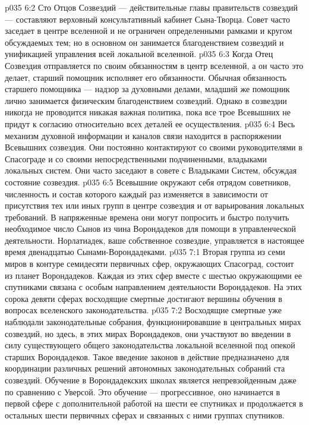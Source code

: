 \vs p035 6:2 Сто Отцов Созвездий --- действительные главы правительств созвездий --- составляют верховный консультативный кабинет Сына\hyp{}Творца. Совет часто заседает в центре вселенной и не ограничен определенными рамками и кругом обсуждаемых тем; но в основном он занимается благоденствием созвездий и унификацией управления всей локальной вселенной.
\vs p035 6:3 Когда Отец Созвездия отправляется по своим обязанностям в центр вселенной, а он часто это делает, старший помощник исполняет его обязанности. Обычная обязанность старшего помощника --- надзор за духовными делами, младший же помощник лично занимается физическим благоденствием созвездий. Однако в созвездии никогда не проводится никакая важная политика, пока все трое Всевышних не придут к согласию относительно всех деталей ее осуществления.
\vs p035 6:4 Весь механизм духовной информации и каналов связи находится в распоряжении Всевышних созвездия. Они постоянно контактируют со своими руководителями в Спасограде и со своими непосредственными подчиненными, владыками локальных систем. Они часто заседают в совете с Владыками Систем, обсуждая состояние созвездия.
\vs p035 6:5 Всевышние окружают себя отрядом советников, численность и состав которого каждый раз изменяется в зависимости от присутствия тех или иных групп в центре созвездия и от варьирования локальных требований. В напряженные времена они могут попросить и быстро получить необходимое число Сынов из чина Ворондадеков для помощи в управленческой деятельности. Норлатиадек, ваше собственное созвездие, управляется в настоящее время двенадцатью Сынами\hyp{}Ворондадеками.
\vs p035 7:1 Вторая группа из семи миров в контуре семидесяти первичных сфер, окружающих Спасоград, состоит из планет Ворондадеков. Каждая из этих сфер вместе с шестью окружающими ее спутниками связана с особым направлением деятельности Ворондадеков. На этих сорока девяти сферах восходящие смертные достигают вершины обучения в вопросах вселенского законодательства.
\vs p035 7:2 Восходящие смертные уже наблюдали законодательные собрания, функционировавшие в центральных мирах созвездий, но здесь, в этих мирах Ворондадеков, они участвуют во введении в силу существующего общего законодательства локальной вселенной под опекой старших Ворондадеков. Такое введение законов в действие предназначено для координации различных решений автономных законодательных собраний ста созвездий. Обучение в Ворондадекских школах является непревзойденным даже по сравнению с Уверсой. Это обучение --- прогрессивное, оно начинается в первой сфере с дополнительной работой на шести ее спутниках и продолжается в остальных шести первичных сферах и связанных с ними группах спутников.
